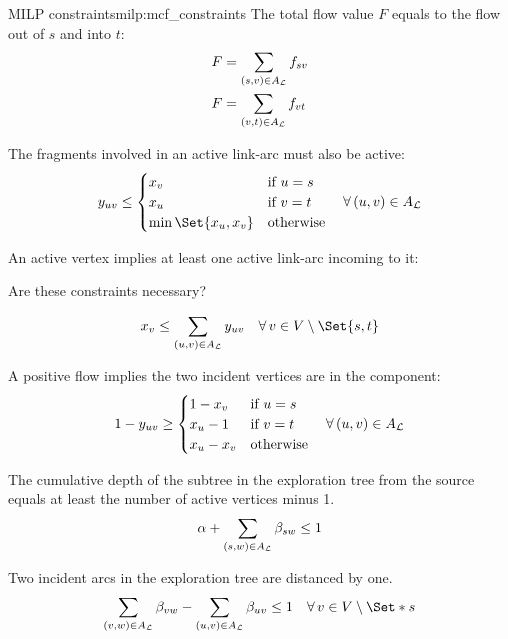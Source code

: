 \begin{definition}{\MCF{} MILP constraints}{milp:mcf_constraints}
  The total flow value \(F\) equals to the flow out of \(s\) and into \(t\):
  \begin{align}
    F & = \sum_{(s, v) \in A_{\mathcal{L}}{}} f_{sv} \\
    F & = \sum_{(v, t) \in A_{\mathcal{L}}{}} f_{vt}
  \end{align}

  The fragments involved in an active link-arc must also be active:
  \begin{equation}
    y_{uv} \leq
    \begin{cases}
      x_v & \text{if \(u = s\)} \\
      x_u & \text{if \(v = t\)} \\
      \min\Set{x_u, x_v} & \text{otherwise}
    \end{cases} \quad \forall (u, v) \in A_\Links{}
  \end{equation}

  An active vertex implies at least one active link-arc incoming to it:
  \begin{questionbox}
    Are these constraints necessary?
  \end{questionbox}
  \begin{equation}
    x_v \leq \sum_{(u, v) \in A_\Links{}} y_{u v} \quad \forall v \in V \setminus \Set{s, t}
  \end{equation}

  A positive flow implies the two incident vertices are in the component:
  \begin{equation}
    1 - y_{uv} \geq
    \begin{cases}
      1 - x_v & \text{if \(u = s\)} \\
      x_u - 1 & \text{if \(v = t\)} \\
      x_u - x_v & \text{otherwise}
    \end{cases}
    \quad \forall (u, v) \in A_\Links{}
  \end{equation}

  The cumulative depth of the subtree in the exploration tree from the source equals at least the number of active vertices minus 1.
  \begin{align}
    \alpha + \sum_{(s, w) \in A_{\mathcal{L}}{}} \beta_{sw} \leq 1
  \end{align}

  Two incident arcs in the exploration tree are distanced by one.
  \begin{align}
    \sum_{(v, w) \in A_\Links{}} \beta_{vw} - \sum_{(u, v) \in A_\Links{}} \beta_{uv} \leq 1 \quad \forall v \in V \setminus \Set*{s}
  \end{align}


\end{definition}
